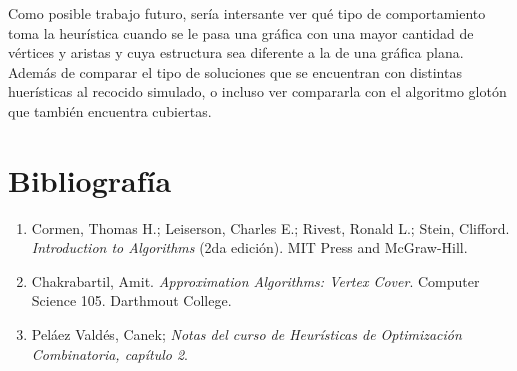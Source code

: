 \documentclass{article}
\newcommand{\tit}[1]{\textit{#1}}
\begin{document}
  Como posible trabajo futuro, sería intersante ver qué tipo de comportamiento 
  toma la heurística cuando se le pasa una gráfica con una mayor cantidad de 
  vértices y aristas y cuya estructura sea diferente a la de una gráfica plana.
  Además de comparar el tipo de soluciones que se encuentran con distintas 
  huerísticas al recocido simulado, o incluso ver compararla con el 
  algoritmo glotón que también encuentra cubiertas.

  \section*{Bibliografía} \label{biblio}

  \begin{enumerate}
    \item Cormen, Thomas H.; Leiserson, Charles E.; Rivest, Ronald L.; Stein, Clifford.
      \tit{Introduction to Algorithms} (2da edición). MIT Press and McGraw-Hill.
    \item Chakrabartil, Amit. \tit{Approximation Algorithms: Vertex Cover}. Computer
      Science 105. Darthmout College.
    \item Peláez Valdés, Canek; \tit{Notas del curso de Heurísticas de Optimización
      Combinatoria, capítulo 2}.
  \end{enumerate}
  
\end{document}
